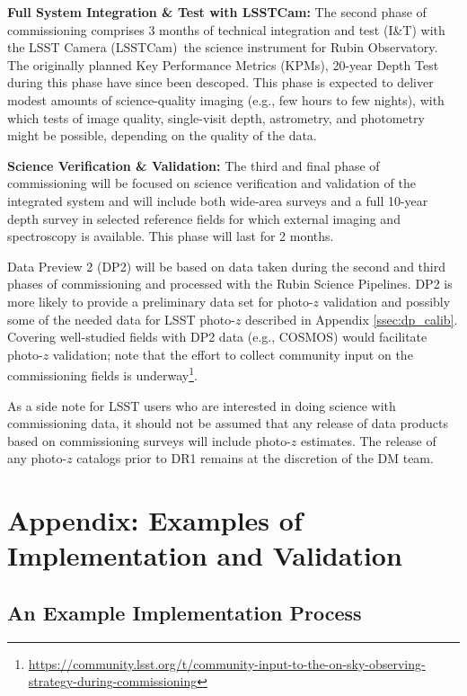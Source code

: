 \documentclass[DM,authoryear,toc]{lsstdoc}
\begin{document}
{\bf Full System Integration \& Test with LSSTCam:}
The second phase of commissioning comprises 3 months of technical integration and test (I\&T) with  the LSST Camera (LSSTCam) \textemdash \,the science instrument for Rubin Observatory. 
The originally planned Key Performance Metrics (KPMs), 20-year Depth Test during this phase have since been descoped. 
This phase is expected to deliver modest amounts of science-quality imaging (e.g., few hours to few nights), with which tests of image quality, single-visit depth, astrometry, and photometry might be possible, depending on the quality of the data. 

{\bf Science Verification \& Validation:}
The third and final phase of commissioning will be focused on science verification and validation of the integrated system and will include both wide-area surveys and a full 10-year depth survey in selected reference fields for which external imaging and spectroscopy is available. 
This phase will last for 2 months. 

Data Preview 2 (DP2) will be based on data taken during the second and third phases of commissioning and processed with the Rubin Science Pipelines. 
DP2 is more likely to provide a preliminary data set for photo-$z$ validation and possibly some of the needed data for LSST photo-$z$ described in Appendix \ref{ssec:dp_calib}. 
Covering well-studied fields with DP2 data (e.g., COSMOS) would facilitate photo-$z$ validation; note that the effort to collect community input on the commissioning fields is underway\footnote{\url{https://community.lsst.org/t/community-input-to-the-on-sky-observing-strategy-during-commissioning}}.

As a side note for LSST users who are interested in doing science with commissioning data, it should not be assumed that any release of data products based on commissioning surveys will include photo-$z$ estimates.
The release of any photo-$z$ catalogs prior to DR1 remains at the discretion of the DM team.



\clearpage
\appendix 

\section{Appendix: Examples of Implementation and Validation}\label{sec:imp}

\subsection{An Example Implementation Process}\label{ssec:imp_imp}
\end{document}
